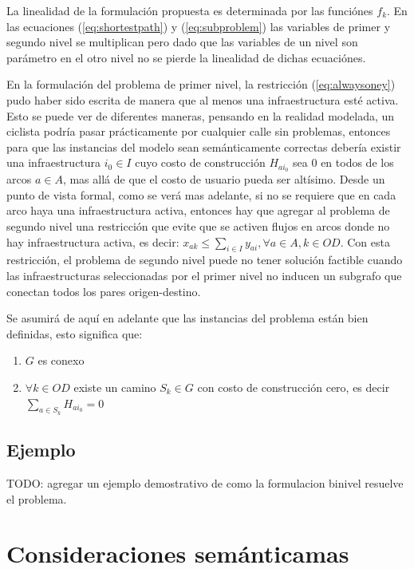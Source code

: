 \documentclass{article}
\begin{document}
  La linealidad de la formulación propuesta es determinada por las funciónes $f_k$. En las ecuaciones (\ref{eq:shortestpath}) y (\ref{eq:subproblem}) las variables de primer y segundo nivel se multiplican pero dado que las variables de un nivel son parámetro en el otro nivel no se pierde la linealidad de dichas ecuaciónes.

  En la formulación del problema de primer nivel, la restricción (\ref{eq:alwaysoney}) pudo haber sido escrita de manera que al menos una infraestructura esté activa. Esto se puede ver de diferentes maneras, pensando en la realidad modelada, un ciclista podría pasar prácticamente por cualquier calle sin problemas, entonces para que las instancias del modelo sean semánticamente correctas debería existir una infraestructura $i_0 \in I$ cuyo costo de construcción $H_{ai_0}$ sea 0 en todos de los arcos $a \in A$, mas allá de que el costo de usuario pueda ser altísimo. Desde un punto de vista formal, como se verá mas adelante, si no se requiere que en cada arco haya una infraestructura activa, entonces hay que agregar al problema de segundo nivel una restricción que evite que se activen flujos en arcos donde no hay infraestructura activa, es decir: $x_{ak} \leq \sum_{i \in I} y_{ai}, \forall a \in A, k \in OD$. Con esta restricción, el problema de segundo nivel puede no tener solución factible cuando las infraestructuras seleccionadas por el primer nivel no inducen un subgrafo que conectan todos los pares origen-destino.

  Se asumirá de aquí en adelante que las instancias del problema están bien definidas, esto significa que:

  \begin{enumerate}
    \item {$G$ es conexo}
    \item {$\forall k \in OD$ existe un camino $S_k \in G$ con costo de construcción cero, es decir $\sum_{a \in S_k} H_{ai_0} = 0$}
  \end{enumerate}

  \subsection*{Ejemplo}

  TODO: agregar un ejemplo demostrativo de como la formulacion binivel resuelve el problema.

  \section*{Consideraciones semánticamas}
\end{document}
